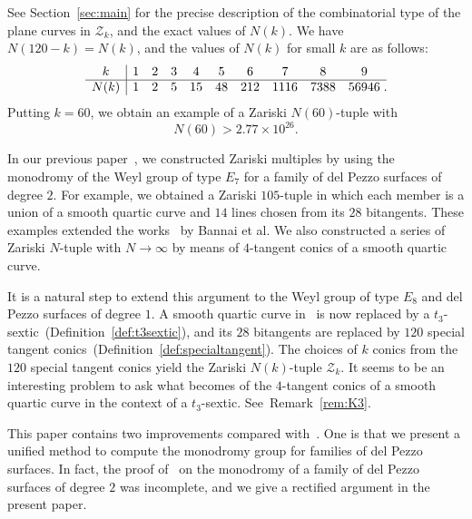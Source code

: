 \documentclass{math}
\theoremstyle{plain}
\numberwithin{equation}{section}
\newcommand{\ZZZ}{\mathord{\mathcal Z}}
\newcommand{\mtan}[1]{t_{#1}}
\begin{document}
%
See Section~\ref{sec:main} for the precise description 
of the combinatorial type 
of the plane curves in  $\ZZZ_k$, and 
the exact values of $N(k)$.
We have $N(120-k)=N(k)$, and 
the values of $N(k)$ for small $k$ are as follows:
%
%
%
%
\begin{equation}\label{eq:Nks}
\begin{array}{c|ccccccccc}
k & 1 & 2 & 3 & 4 & 5 & 6 &7 &8 &9 \\
\hline 
N(k) & 1& 2 & 5 & 15 & 48 & 212 &1116& 7388& 56946\rlap{\;.}
\end{array}
\end{equation}
%
Putting $k=60$,
we obtain an example of a  Zariski $N(60)$-tuple with 
%
\begin{equation*}\label{eq:largeN}
N(60)>2.77\times 10^{26}.
\end{equation*}
%
%
\par
In our previous paper~\cite{Shimada2022},
we constructed  Zariski multiples by
using the monodromy of the Weyl group of type $E_7$
for a family of del Pezzo surfaces of degree $2$.
For example, we obtained a Zariski $105$-tuple 
in which each member is 
a union of a smooth quartic curve and $14$ lines chosen from its $28$ bitangents.
These examples extended the works~\cite{Bannai2016, Bannai2019, Bannai2020}
by Bannai et al.
We also constructed a series of  Zariski $N$-tuple with $N\to \infty$  by 
means of
 $4$-tangent conics of a smooth quartic curve.
\par
It is a natural step to extend this argument to 
the  Weyl group of type $E_8$ and 
del Pezzo surfaces of degree $1$.
A smooth quartic curve  in~\cite{Shimada2022} is now replaced by a $\mtan{3}$-sextic~(Definition~\ref{def:t3sextic}),
and its $28$ bitangents are replaced by $120$ special tangent conics~(Definition~\ref{def:specialtangent}).
The choices of $k$ conics from the $120$ special tangent conics yield
the Zariski $N(k)$-tuple $\ZZZ_k$.
It seems to be an interesting problem 
 to ask what becomes of the $4$-tangent conics of a smooth quartic curve in the context of a $\mtan{3}$-sextic.
 See~Remark~\ref{rem:K3}.
\par
This paper contains two improvements compared with~\cite{Shimada2022}.
One is that we present a  unified method to compute the monodromy group 
for families of del Pezzo surfaces.
In fact, the proof of~\cite[Theorem~3.1]{Shimada2022} on the monodromy of a family of  del Pezzo surfaces of degree  $2$ 
was incomplete, and we give a rectified argument in the present paper.
\end{document}

